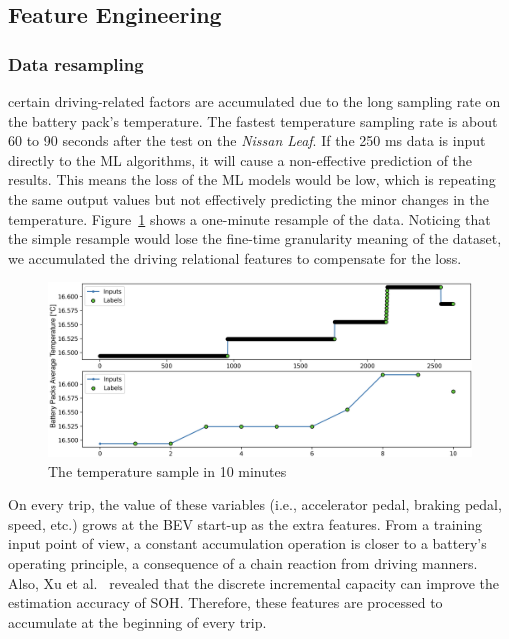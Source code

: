 \subsection{Feature Engineering}

\subsubsection{Data resampling}

certain driving-related factors are accumulated due to the long sampling rate on the battery pack's temperature. 
The fastest temperature sampling rate is about 60 to 90 seconds after the test on the \textit{Nissan Leaf}. 
If the 250 ms data is input directly to the \gls{ML} algorithms, it will cause a non-effective prediction of the results. 
This means the loss of the \gls{ML} models would be low, which is repeating the same output values but not effectively predicting the minor changes in the temperature. 
Figure~\ref{fig:temp_sample} shows a one-minute resample of the data. 
Noticing that the simple resample would lose the fine-time granularity meaning of the dataset, we accumulated the driving relational features to compensate for the loss.

\begin{figure}[hbt]%
\begin {center}
\includegraphics[width=\textwidth]{Chapter5/figures/data_sample2.png}
\caption{The temperature sample in 10 minutes}
\label{fig:temp_sample}
\end {center}
\end{figure}

On every trip, the value of these variables (i.e., accelerator pedal, braking pedal, speed, etc.) grows at the \gls{BEV} start-up as the extra features. 
From a training input point of view, a constant accumulation operation is closer to a battery's operating principle, a consequence of a chain reaction from driving manners. 
Also, Xu et al.~\cite{xu2021estimation} revealed that the discrete incremental capacity can improve the estimation accuracy of \gls{SOH}. 
Therefore, these features are processed to accumulate at the beginning of every trip. 

